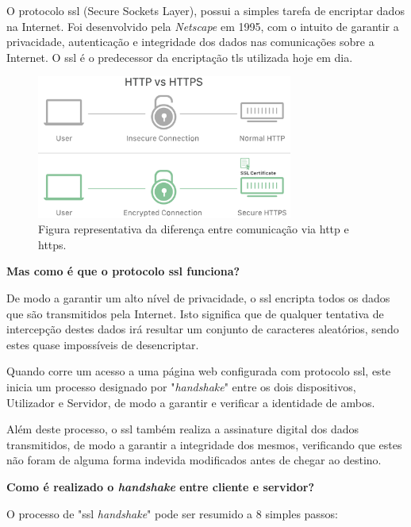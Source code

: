 O protocolo \gls{ssl} (Secure Sockets Layer), possui a simples tarefa de encriptar dados na Internet. Foi desenvolvido pela \emph{Netscape} em 1995, com o intuito de garantir a privacidade, autenticação e integridade dos dados nas comunicações sobre a Internet. O \gls{ssl} é o predecessor da encriptação \gls{tls} utilizada hoje em dia.

\begin{figure}[h]
    \centering
    \includegraphics[width=0.75\textwidth]{img/ssl/comparison.png}
    \caption{Figura representativa da diferença entre comunicação via \gls{http} e \gls{https}.}
\end{figure}

\vspace{5mm}
\textbf{Mas como é que o protocolo \gls{ssl} funciona?}

De modo a garantir um alto nível de privacidade, o \gls{ssl} encripta todos os dados que são transmitidos pela Internet. Isto significa que de qualquer tentativa de intercepção destes dados irá resultar um conjunto de caracteres aleatórios, sendo estes quase impossíveis de desencriptar.

Quando corre um acesso a uma página web configurada com protocolo \gls{ssl}, este inicia um processo designado por "\emph{handshake}" entre os dois dispositivos, Utilizador e Servidor, de modo a garantir e verificar a identidade de ambos.

Além deste processo, o \gls{ssl} também realiza a assinature digital dos dados transmitidos, de modo a garantir a integridade dos mesmos, verificando que estes não foram de alguma forma indevida modificados antes de chegar ao destino.

\cleardoublepage
\textbf{Como é realizado o \emph{handshake} entre cliente e servidor?}

O processo de "\gls{ssl} \emph{handshake}" pode ser resumido a 8 simples passos:

